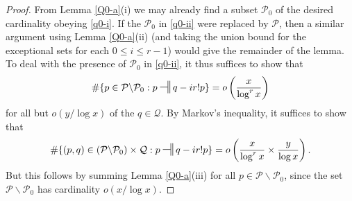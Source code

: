 \documentclass[11pt]{amsart}
\numberwithin{equation}{section}  %
\theoremstyle{remark}
\theoremstyle{plain}
\newtheorem{lem}{Lemma}[section]
\numberwithin{equation}{section}
\newcommand{\be}{\begin{equation}}
\newcommand{\ee}{\end{equation}}
\renewcommand{\le}{\leqslant}
\renewcommand{\leq}{\leqslant}
\renewcommand{\ge}{\geqslant}
\renewcommand{\(}{\left(}
\renewcommand{\)}{\right)}
\newcommand{\relr}{\nsdtstile{}{}} %
\newcommand{\PP}{\mathcal{P}}
\newcommand{\QQ}{\mathcal{Q}}
\begin{document}
\begin{proof}  From Lemma \ref{Q0-a}(i) we may already find a subset $\PP_0$ of the desired cardinality obeying \eqref{q0-i}.  If the $\PP_0$ in \eqref{q0-ii} were replaced by $\PP$, then a similar argument using Lemma \ref{Q0-a}(ii) (and taking the union bound for the exceptional sets for each $0 \leq i \leq r-1$) would give the remainder of the lemma.  To deal with the presence of $\PP_0$ in \eqref{q0-ii}, it thus suffices to show that
$$
 \# \{ p \in \PP \backslash \PP_0 : p \relr q-ir!p \} = o\left( \frac{x}{\log^r x} \right)$$
for all but $o(y/\log x)$ of the $q \in \QQ$.  By Markov's inequality, it suffices to show that
$$
 \# \{ (p,q) \in (\PP \backslash \PP_0) \times \QQ : p \relr q-ir!p \} = o\left( \frac{x}{\log^r x} \times \frac{y}{\log x}\right).$$
But this follows by summing Lemma \ref{Q0-a}(iii) for all $p \in \PP \backslash \PP_0$, since the set $\PP \backslash \PP_0$ has cardinality $o(x/\log x)$.
\end{proof}






\end{document}
